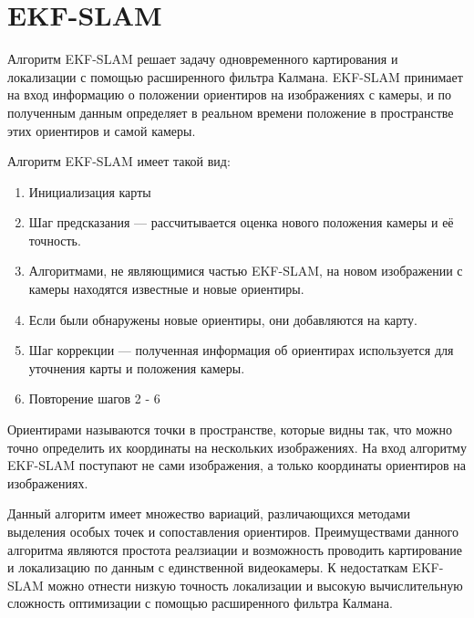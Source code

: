 \documentclass{mipt-thesis-bs}
\begin{document}
\section{EKF-SLAM}
Алгоритм EKF-SLAM решает задачу одновременного картирования и локализации с помощью расширенного фильтра Калмана. EKF-SLAM принимает на вход информацию о положении ориентиров на изображениях с камеры, и по полученным данным определяет в реальном времени положение в пространстве этих ориентиров и самой камеры.

Алгоритм EKF-SLAM имеет такой вид:

\begin{enumerate}
\item Инициализация карты
\item Шаг предсказания — рассчитывается оценка нового положения камеры и её точность.
\item Алгоритмами, не являющимися частью EKF-SLAM, на новом изображении с камеры находятся известные и новые ориентиры.
\item Если были обнаружены новые ориентиры, они добавляются на карту.
\item Шаг коррекции — полученная информация об ориентирах используется для уточнения карты и положения камеры.
\item Повторение шагов 2 - 6
\end{enumerate}

Ориентирами называются точки в пространстве, которые видны так, что можно точно определить их координаты на нескольких изображениях. На вход алгоритму EKF-SLAM поступают не сами изображения, а только координаты ориентиров на изображениях.

Данный алгоритм имеет множество вариаций, различающихся методами выделения особых точек и сопоставления ориентиров. Преимуществами данного алгоритма являются простота реалзиации и возможность проводить картирование и локализацию по данным с единственной видеокамеры. К недостаткам EKF-SLAM можно отнести низкую точность локализации и высокую вычислительную сложность оптимизации с помощью расширенного фильтра Калмана.
\end{document}
